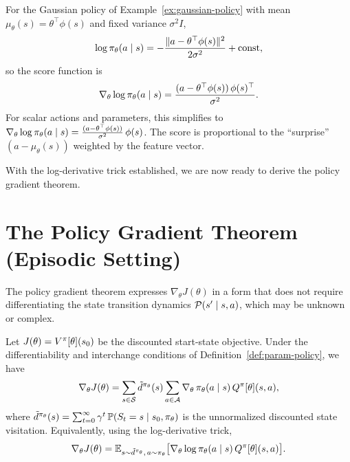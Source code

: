 \documentclass[11pt,a4paper]{article}
\begin{document}
\begin{example}
\label{ex:score-gaussian}
For the Gaussian policy of Example~\ref{ex:gaussian-policy} with mean
$\mu_\theta(s) = \theta^\top \phi(s)$ and fixed variance $\sigma^2 I$,
\[
  \log \pi_\theta(a \mid s)
  = -\frac{\|a - \theta^\top \phi(s)\|^2}{2\sigma^2} + \text{const},
\]
so the score function is
\[
  \nabla_\theta \log \pi_\theta(a \mid s)
  = \frac{(a - \theta^\top \phi(s))\, \phi(s)^\top}{\sigma^2}.
\]
For scalar actions and parameters, this simplifies to
$\nabla_\theta \log \pi_\theta(a \mid s)
= \frac{(a - \theta^\top \phi(s))}{\sigma^2}\, \phi(s)$.
The score is proportional to the ``surprise'' $(a - \mu_\theta(s))$
weighted by the feature vector.
\end{example}

With the log-derivative trick established, we are now ready to derive the
policy gradient theorem.

\section{The Policy Gradient Theorem (Episodic Setting)}

The policy gradient theorem expresses $\nabla_\theta J(\theta)$ in a form
that does not require differentiating the state transition dynamics
$\mathcal{P}(s' \mid s, a)$, which may be unknown or complex.

\begin{theorem}
\label{thm:pg-episodic}
Let $J(\theta) = V^{\pi}[\theta](s_0)$ be the discounted start-state
objective. Under the differentiability and interchange conditions of
Definition~\ref{def:param-policy}, we have
\[
  \nabla_\theta J(\theta)
  = \sum_{s \in \mathcal{S}} \tilde{d}^{\pi_\theta}(s)
    \sum_{a \in \mathcal{A}}
    \nabla_\theta\, \pi_\theta(a \mid s)\, Q^{\pi}[\theta](s,a),
\]
where $\tilde{d}^{\pi_\theta}(s) = \sum_{t=0}^{\infty} \gamma^t\,
\mathbb{P}(S_t = s \mid s_0, \pi_\theta)$ is the unnormalized discounted
state visitation. Equivalently, using the log-derivative trick,
\[
  \nabla_\theta J(\theta)
  = \mathbb{E}_{s \sim \tilde{d}^{\pi_\theta},\, a \sim \pi_\theta}
    \bigl[\nabla_\theta \log \pi_\theta(a \mid s)\, Q^{\pi}[\theta](s,a)\bigr].
\]
\end{theorem}
\end{document}
